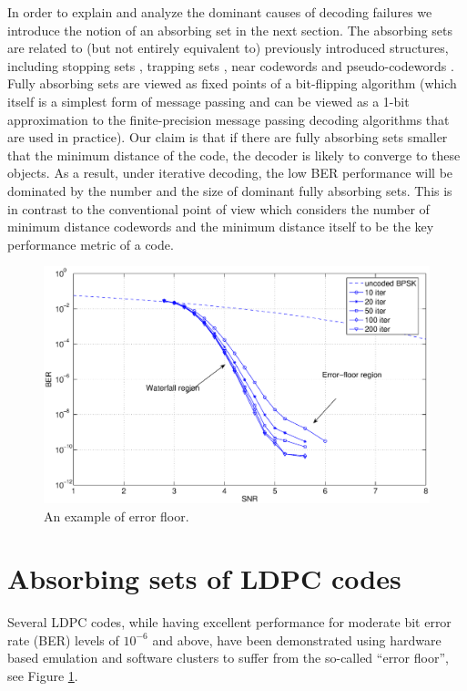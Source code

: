 In order to explain and analyze the dominant causes of decoding
failures we introduce the notion of an absorbing set in the next
section. The absorbing sets are related to (but not entirely
equivalent to) previously introduced structures, including stopping
sets \cite{di_stop}, trapping sets \cite{richardson}, near codewords
\cite{mackay} and pseudo-codewords \cite{wainwrig}. Fully absorbing
sets are viewed as fixed points of a bit-flipping algorithm (which
itself is a simplest form of message passing and can be viewed as a
1-bit approximation to the finite-precision message passing decoding
algorithms that are used in practice). Our claim is that if there
are fully absorbing sets smaller that the minimum distance of the
code, the decoder is likely to converge to these objects. As a
result, under iterative decoding, the low BER performance will be
dominated by the number and the size of dominant fully absorbing
sets. This is in contrast to the conventional point of view which
considers the number of minimum distance codewords and the minimum
distance itself to be the key performance metric of a code.


\begin{figure}
\center\includegraphics[width=4.75in,keepaspectratio]{iter_globecom3.ps}
\caption{An example of error floor.} \label{errorfig}
\end{figure}


\section{Absorbing sets of LDPC codes}


Several LDPC codes, while having excellent performance for
moderate bit error rate (BER) levels of $10^{-6}$ and above, have
been demonstrated using hardware based emulation \cite{zhang06}
and software clusters \cite{cluster} to suffer from the so-called
``error floor'', see Figure \ref{errorfig}.


